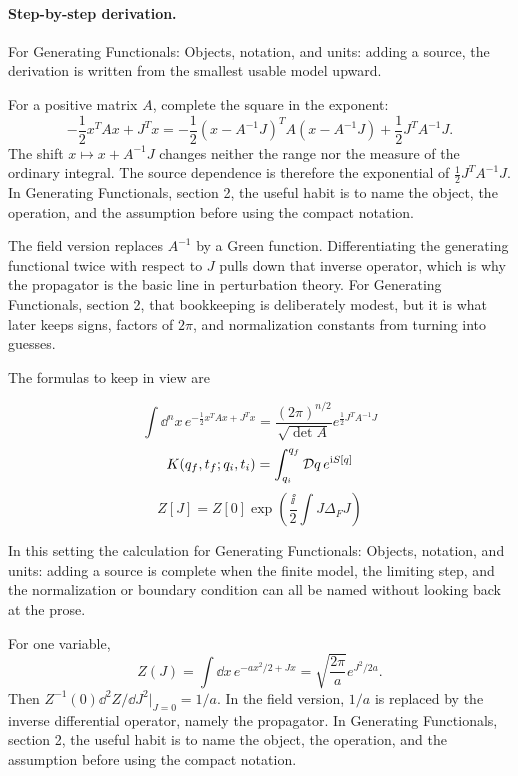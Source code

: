 \paragraph{Step-by-step derivation.}

For Generating Functionals: Objects, notation, and units: adding a source, the derivation is written from the smallest usable model upward.

For a positive matrix \(A\), complete the square in the exponent:
\[
  -\frac12x^TAx+J^Tx
  =
  -\frac12(x-A^{-1}J)^TA(x-A^{-1}J)
  +\frac12J^TA^{-1}J.
\]
The shift \(x\mapsto x+A^{-1}J\) changes neither the range nor the measure of the ordinary integral.  The source dependence is therefore the exponential of \(\frac12J^TA^{-1}J\).  In Generating Functionals, section 2, the useful habit is to name the object, the operation, and the assumption before using the compact notation.

The field version replaces \(A^{-1}\) by a Green function.  Differentiating the generating functional twice with respect to \(J\) pulls down that inverse operator, which is why the propagator is the basic line in perturbation theory.  For Generating Functionals, section 2, that bookkeeping is deliberately modest, but it is what later keeps signs, factors of \(2\pi\), and normalization constants from turning into guesses.

The formulas to keep in view are

\[
  \int\dd^n x\,e^{-\frac12x^TAx+J^Tx}=\frac{(2\pi)^{n/2}}{\sqrt{\det A}}e^{\frac12J^TA^{-1}J}
\]
\[
  K(q_f,t_f;q_i,t_i)=\int_{q_i}^{q_f}\mathcal D q\,e^{\mathrm i S[q]}
\]
\[
  Z[J]=Z[0]\exp\left(\frac{\ii}{2}\int J\Delta_FJ\right)
\]

In this setting the calculation for Generating Functionals: Objects, notation, and units: adding a source is complete when the finite model, the limiting step, and the normalization or boundary condition can all be named without looking back at the prose.




\begin{example}
For one variable,
\[
  Z(J)=\int\dd x\,e^{-ax^2/2+Jx}
  =\sqrt{\frac{2\pi}{a}}e^{J^2/2a}.
\]
Then \(Z^{-1}(0)\dd^2Z/\dd J^2|_{J=0}=1/a\).  In the field version, \(1/a\) is replaced by the inverse differential operator, namely the propagator.  In Generating Functionals, section 2, the useful habit is to name the object, the operation, and the assumption before using the compact notation.
\end{example}



